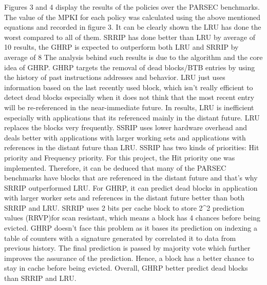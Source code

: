 \documentclass[11pt]{article}
\begin{document}
Figures 3 and 4 display the results of the policies over the PARSEC benchmarks. The value of the MPKI for each policy was calculated using the above mentioned equations and
recorded in figure 3. It can be clearly shown the LRU has done the worst compared to all of them. SRRIP has done better than LRU by average of 10%
results, the GHRP is expected to outperform both LRU and SRRIP by average of 8%
The analysis behind such results is due to the algorithm and the core idea of GHRP. GHRP targets the removal of dead blocks/BTB entries by using the history of past 
instructions addresses and behavior. LRU just uses information based on the last recently used block, which isn’t really efficient to detect dead blocks especially when it does
not think that the most recent entry will be re-referenced in
the near-immediate future. In results, LRU is inefficient especially with applications that its referenced mainly in the distant future. LRU replaces the blocks very 
frequently. 
 SSRIP uses lower hardware overhead and deals better with applications with larger working sets and applications with references in the distant future than LRU. SSRIP has two 
kinds of priorities: Hit priority and Frequency priority. For this project, the Hit priority one was implemented. Therefore, it can be deduced that many of the PARSEC 
benchmarks have blocks that are referenced in the distant future and that’s why SRRIP outperformed LRU. For GHRP, it can predict dead blocks in application with larger worker 
sets and references in the distant future better than both SRRIP and LRU. SRRIP uses 2 bits per cache block to store 2^2 prediction values (RRVP)for scan resistant, which means
a block has 4 chances before being evicted. GHRP doesn’t face this problem as it bases its prediction on indexing a table of counters with a signature generated by correlated 
it to data from previous history. The final prediction is passed by majority vote which further improves the assurance of the prediction. Hence, a block has a better chance to 
stay in cache before being evicted. Overall, GHRP better predict dead blocks than SRRIP and LRU. 
\end{document}

